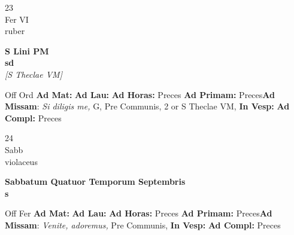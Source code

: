 \documentclass[10pt, openany]{book}
\begin{document}
    \begin{center}
        \begin{minipage}{3.5in}
            \vspace{2em}
            \begin{minipage}{0.5in}
                {\Huge 23} \\
                {\normalsize Fer VI} \\
                {\normalsize ruber}
            \end{minipage}
            \begin{minipage}{3.0in}
                \textbf{ \large S Lini PM \\
                \textnormal{\normalsize sd}} \\ \textit{[S Theclae VM]} \\ 
            \end{minipage}
            \begin{justify}Off Ord
                \textbf{Ad Mat: }
                \textbf{Ad Lau: }
                \textbf{Ad Horas: }Preces
                \textbf{Ad Primam: }Preces\textbf{Ad Missam}: \textit{Si diligis me,} G, Pre Communis, 2 or S Theclae VM,  
                \textbf{In Vesp: }
                \textbf{Ad Compl: }Preces
            \end{justify}
        \end{minipage}
    \end{center}

    \begin{center}
        \begin{minipage}{3.5in}
            \vspace{2em}
            \begin{minipage}{0.5in}
                {\Huge 24} \\
                {\normalsize Sabb} \\
                {\normalsize violaceus}
            \end{minipage}
            \begin{minipage}{3.0in}
                \textbf{ \large Sabbatum Quatuor Temporum Septembris \\
                \textnormal{\normalsize s}} \\ 
            \end{minipage}
            \begin{justify}Off Fer
                \textbf{Ad Mat: }
                \textbf{Ad Lau: }
                \textbf{Ad Horas: }Preces
                \textbf{Ad Primam: }Preces\textbf{Ad Missam}: \textit{Venite, adoremus,} Pre Communis,  
                \textbf{In Vesp: }
                \textbf{Ad Compl: }Preces
            \end{justify}
        \end{minipage}
    \end{center}
\end{document}
